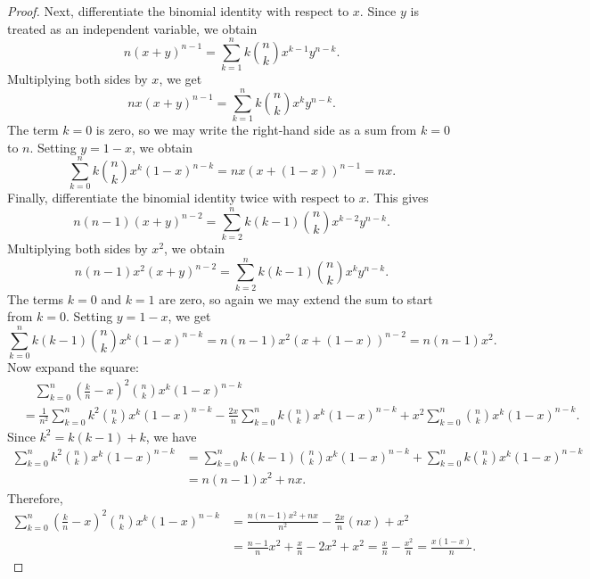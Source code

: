 \begin{proof}
    Next, differentiate the binomial identity with respect to \(x\). Since \(y\) is treated as an independent variable, we obtain 
    \[
        n(x + y)^{n - 1} = \sum_{k=1}^n k \binom{n}{k} x^{k - 1} y^{n - k}. 
    \]  
    Multiplying both sides by \(x\), we get 
    \[
        nx(x + y)^{n - 1} = \sum_{k=1}^n k \binom{n}{k} x^k y^{n - k}. 
    \] 
    The term \(k = 0\) is zero, so we may write the right-hand side as a sum from \(k = 0\) to \(n\). Setting \(y = 1 - x\), we obtain 
    \[
        \sum_{k=0}^n k \binom{n}{k} x^k (1 - x)^{n - k} = nx(x+(1 - x))^{n - 1} = nx. 
    \]    
    Finally, differentiate the binomial identity twice with respect to \(x\). This gives 
    \[
        n(n - 1)(x + y)^{n - 2} = \sum_{k=2}^n k(k - 1) \binom{n}{k} x^{k - 2} y^{n - k}. 
    \] 
    Multiplying both sides by \(x^2\), we obtain 
    \[
        n(n - 1)x^2 (x+y)^{n - 2} = \sum_{k=2}^n k(k - 1) \binom{n}{k} x^k y^{n-k}. 
    \] 
    The terms \(k = 0\) and \(k = 1\) are zero, so again we may extend the sum to start from \(k = 0\). Setting \(y = 1 - x\), we get 
    \[
        \sum_{k=0}^n k(k - 1) \binom{n}{k} x^k (1 - x)^{n - k} = n(n - 1)x^2 (x + (1 - x))^{n - 2} = n( n - 1)x^2. 
    \]    
    Now expand the square:
    \begin{align*}
        &\quad \sum_{k=0}^n \left( \frac{k}{n} - x \right)^2 \binom{n}{k} x^k (1 - x)^{n - k} \\
        &= \frac{1}{n^2} \sum_{k=0}^n k^2 \binom{n}{k} x^k (1 - x)^{n - k} - \frac{2x}{n} \sum_{k=0}^n k \binom{n}{k} x^k (1 - x)^{n - k} + x^2 \sum_{k=0}^n \binom{n}{k} x^k (1 - x)^{n - k}.     
    \end{align*}
    Since \(k^2 = k(k - 1) + k\), we have 
    \begin{align*}
        \sum_{k=0}^n k^2 \binom{n}{k} x^k (1 - x)^{n - k} &= \sum_{k=0}^n k(k - 1) \binom{n}{k} x^k (1 - x)^{n - k} + \sum_{k=0}^n k \binom{n}{k} x^k (1 - x)^{n - k} \\
        &= n(n - 1)x^2 + nx.   
    \end{align*} 
    Therefore,
    \begin{align*}
        \sum_{k=0}^n \left( \frac{k}{n} - x \right)^2 \binom{n}{k} x^k (1 - x)^{n - k} &= \frac{n(n - 1)x^2 + nx}{n^2} - \frac{2x}{n} (nx) + x^2 \\
        &= \frac{n - 1}{n} x^2 + \frac{x}{n} - 2x^2 + x^2 = \frac{x}{n} - \frac{x^2}{n} = \frac{x(1-x)}{n}.  
    \end{align*}
\end{proof}

